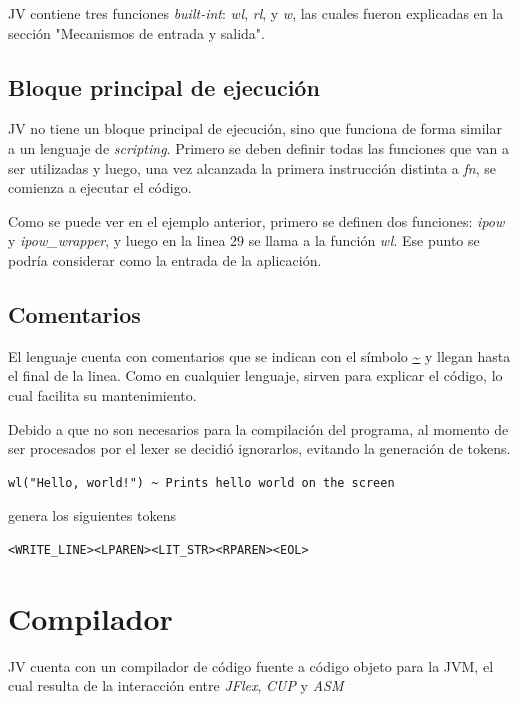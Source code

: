 \documentclass{article}
\begin{document}
                \par JV contiene tres funciones \textit{built-int}: \textit{wl}, \textit{rl}, y \textit{w}, las cuales fueron explicadas en la sección "Mecanismos de entrada y salida".

            \subsection{Bloque principal de ejecución}
                \par JV no tiene un bloque principal de ejecución, sino que funciona de forma similar a un lenguaje de \textit{scripting}. Primero se deben definir todas las funciones que van a ser utilizadas y luego, una vez alcanzada la primera instrucción distinta a \textit{fn}, se comienza a ejecutar el código.
                \par Como se puede ver en el ejemplo anterior, primero se definen dos funciones: \textit{ipow} y \textit{ipow\_wrapper}, y luego en la linea 29 se llama a la función \textit{wl}. Ese punto se podría considerar como la entrada de la aplicación. 

            \subsection{Comentarios}
                \par El lenguaje cuenta con comentarios que se indican con el símbolo \url{~} y llegan hasta el final de la linea. Como en cualquier lenguaje, sirven para explicar el código, lo cual facilita su mantenimiento.
                \par Debido a que no son necesarios para la compilación del programa, al momento de ser procesados por el lexer se decidió ignorarlos, evitando la generación de tokens.
                \begin{lstlisting}
wl("Hello, world!") ~ Prints hello world on the screen
                \end{lstlisting} 
                genera los siguientes tokens
                \begin{lstlisting}
<WRITE_LINE><LPAREN><LIT_STR><RPAREN><EOL>
                \end{lstlisting}
        \clearpage

    \section{Compilador}
        \par JV cuenta con un compilador de código fuente a código objeto para la JVM, el cual resulta de la interacción entre \textit{JFlex}, \textit{CUP} y \textit{ASM}
\end{document}
